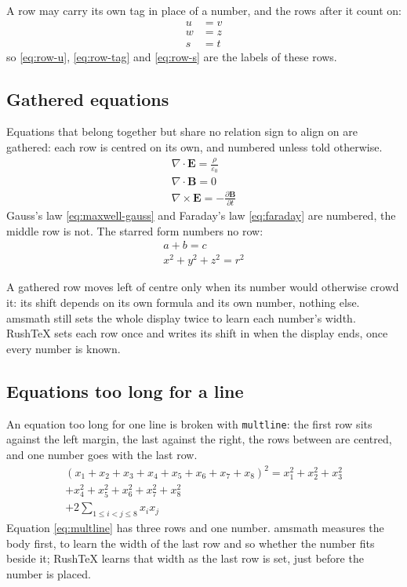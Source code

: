 \documentclass{article}
\numberwithin{equation}{section}
\theoremstyle{definition}
\theoremstyle{remark}
\begin{document}
A row may carry its own tag in place of a number, and the rows after it count on:
\begin{align}
  u &= v \label{eq:row-u}\\
  w &= z \tag{T} \label{eq:row-tag}\\
  s &= t \label{eq:row-s}
\end{align}
so \eqref{eq:row-u}, \eqref{eq:row-tag} and \eqref{eq:row-s} are the labels of these rows.

\subsection{Gathered equations}

Equations that belong together but share no relation sign to align on are gathered:
each row is centred on its own, and numbered unless told otherwise.
\begin{gather}
  \nabla \cdot \mathbf{E} = \frac{\rho}{\varepsilon_0} \label{eq:maxwell-gauss} \\
  \nabla \cdot \mathbf{B} = 0 \nonumber \\
  \nabla \times \mathbf{E} = -\frac{\partial \mathbf{B}}{\partial t} \label{eq:faraday}
\end{gather}
Gauss's law \eqref{eq:maxwell-gauss} and Faraday's law \eqref{eq:faraday} are numbered, the
middle row is not. The starred form numbers no row:
\begin{gather*}
  a + b = c \\
  x^{2} + y^{2} + z^{2} = r^{2}
\end{gather*}

A gathered row moves left of centre only when its number would otherwise crowd it: its
shift depends on its own formula and its own number, nothing else. amsmath still sets
the whole display twice to learn each number's width. RushTeX sets each row once and
writes its shift in when the display ends, once every number is known.

\subsection{Equations too long for a line}

An equation too long for one line is broken with \texttt{multline}: the first row sits
against the left margin, the last against the right, the rows between are centred, and
one number goes with the last row.
\begin{multline}
  (x_1 + x_2 + x_3 + x_4 + x_5 + x_6 + x_7 + x_8)^{2} = x_1^{2} + x_2^{2} + x_3^{2} \\
  + x_4^{2} + x_5^{2} + x_6^{2} + x_7^{2} + x_8^{2} \\
  + 2 \sum_{1 \le i < j \le 8} x_i x_j \label{eq:multline}
\end{multline}
Equation \eqref{eq:multline} has three rows and one number. amsmath measures the body
first, to learn the width of the last row and so whether the number fits beside it;
RushTeX learns that width as the last row is set, just before the number is placed.
\end{document}
